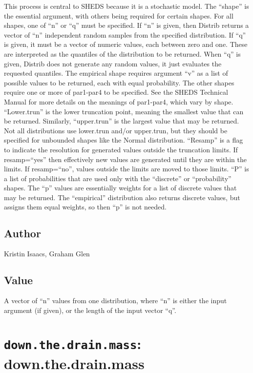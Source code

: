 \documentclass[
]{article}
\begin{document}
This process is central to SHEDS because it is a stochastic model. The
``shape'' is the essential argument, with others being required for
certain shapes. For all shapes, one of ``n'' or ``q'' must be specified.
If ``n'' is given, then Distrib returns a vector of ``n'' independent
random samples from the specified distribution. If ``q'' is given, it
must be a vector of numeric values, each between zero and one. These are
interpreted as the quantiles of the distribution to be returned. When
``q'' is given, Distrib does not generate any random values, it just
evaluates the requested quantiles. The empirical shape requires argument
``v'' as a list of possible values to be returned, each with equal
probability. The other shapes require one or more of par1-par4 to be
specified. See the SHEDS Technical Manual for more details on the
meanings of par1-par4, which vary by shape. ``Lower.trun'' is the lower
truncation point, meaning the smallest value that can be returned.
Similarly, ``upper.trun'' is the largest value that may be returned. Not
all distributions use lower.trun and/or upper.trun, but they should be
specified for unbounded shapes like the Normal distribution. ``Resamp''
is a flag to indicate the resolution for generated values outside the
truncation limits. If resamp=``yes'' then effectively new values are
generated until they are within the limits. If resamp=``no'', values
outside the limits are moved to those limits. ``P'' is a list of
probabilities that are used only with the ``discrete'' or
``probability'' shapes. The ``p'' values are essentially weights for a
list of discrete values that may be returned. The ``empirical''
distribution also returns discrete values, but assigns them equal
weights, so then ``p'' is not needed.

\hypertarget{author-13}{%
\subsection{Author}\label{author-13}}

Kristin Isaacs, Graham Glen

\hypertarget{value-12}{%
\subsection{Value}\label{value-12}}

A vector of ``n'' values from one distribution, where ``n'' is either
the input argument (if given), or the length of the input vector ``q''.

\hypertarget{down.the.drain.mass-down.the.drain.mass}{%
\section{\texorpdfstring{\texttt{down.the.drain.mass}:
down.the.drain.mass}{down.the.drain.mass: down.the.drain.mass}}\label{down.the.drain.mass-down.the.drain.mass}}
\end{document}
